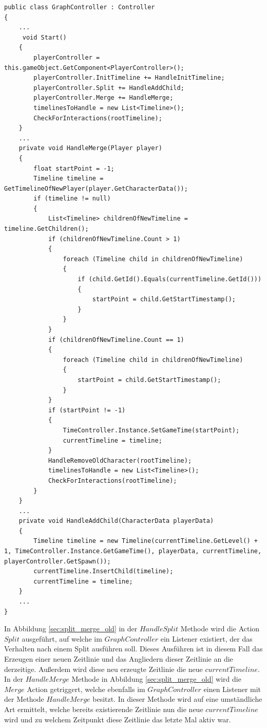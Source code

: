 \begin{lstlisting}[caption={Split und Merge listener}, label={sec:split_merge_old_graph}]
public class GraphController : Controller
{
    ...
     void Start()
    {
        playerController = this.gameObject.GetComponent<PlayerController>();
        playerController.InitTimeline += HandleInitTimeline;
        playerController.Split += HandleAddChild;
        playerController.Merge += HandleMerge;
        timelinesToHandle = new List<Timeline>();
        CheckForInteractions(rootTimeline);
    }
    ...
    private void HandleMerge(Player player)
    {
        float startPoint = -1;
        Timeline timeline = GetTimelineOfNewPlayer(player.GetCharacterData());
        if (timeline != null)
        {
            List<Timeline> childrenOfNewTimeline = timeline.GetChildren();
            if (childrenOfNewTimeline.Count > 1)
            {
                foreach (Timeline child in childrenOfNewTimeline)
                {
                    if (child.GetId().Equals(currentTimeline.GetId()))
                    {
                        startPoint = child.GetStartTimestamp();
                    }
                }
            }
            if (childrenOfNewTimeline.Count == 1)
            {
                foreach (Timeline child in childrenOfNewTimeline)
                {
                    startPoint = child.GetStartTimestamp();
                }
            }
            if (startPoint != -1)
            {
                TimeController.Instance.SetGameTime(startPoint);
                currentTimeline = timeline;
            }
            HandleRemoveOldCharacter(rootTimeline);
            timelinesToHandle = new List<Timeline>();
            CheckForInteractions(rootTimeline);
        }
    }
    ...
    private void HandleAddChild(CharacterData playerData)
    {
        Timeline timeline = new Timeline(currentTimeline.GetLevel() + 1, TimeController.Instance.GetGameTime(), playerData, currentTimeline, playerController.GetSpawn());
        currentTimeline.InsertChild(timeline);
        currentTimeline = timeline;
    }
    ...
}
\end{lstlisting}

In Abbildung \ref{sec:split_merge_old} in der $HandleSplit$ Methode wird die Action $Split$ ausgeführt, auf welche im $GraphController$ ein Listener existiert, der das Verhalten nach einem Split ausführen soll. Dieses Ausführen ist in diesem Fall das Erzeugen einer neuen Zeitlinie und das Angliedern dieser Zeitlinie an die derzeitige. Außerdem wird diese neu erzeugte Zeitlinie die neue $currentTimeline$.
In der $HandleMerge$ Methode in Abbildung \ref{sec:split_merge_old} wird die $Merge$ Action getriggert, welche ebenfalls im $GraphController$ einen Listener mit der Methode $HandleMerge$ besitzt. In dieser Methode wird auf eine umständliche Art ermittelt, welche bereits existierende Zeitlinie nun die neue $currentTimeline$ wird und zu welchem Zeitpunkt diese Zeitlinie das letzte Mal aktiv war. 

